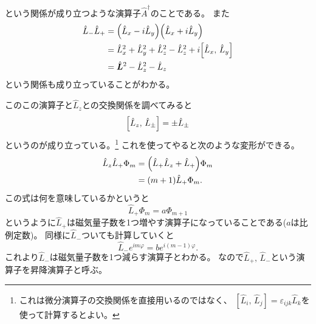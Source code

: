 \documentclass[../../master.tex]{subfiles}
\begin{document}
という関係が成り立つような演算子\(\hat{A}^\dag\)のことである。
また
\begin{equation}\begin{aligned}[b]
    \hat{L}_- \hat{L}_+ & = \qty(\hat{L}_x - i \hat{L}_y)\qty(\hat{L}_x + i\hat{L}_y)                         \\
	                    & =\hat{L}_x^2+\hat{L}_y^2 + \hat{L}_z^2 - \hat{L}_z^2 + i\qty[\hat{L}_x,\,\hat{L}_y] \\
	                    & =\hat{\vb*{L}}^2 -\hat{L}_z^2 -\hat{L}_z
\end{aligned}\end{equation}
という関係も成り立っていることがわかる。

このこの演算子と\(\hat{L}_z\)との交換関係を調べてみると
\begin{equation}
	\qty[\hat{L}_z,\,\hat{L}_\pm] = \pm \hat{L}_\pm
\end{equation}
というのが成り立っている。\footnote{これは微分演算子の交換関係を直接用いるのではなく、
	\([\hat{L}_i,\,\hat{L}_j]=\varepsilon_{ijk}\hat{L}_k\)を使って計算するとよい。}
これを使ってやると次のような変形ができる。
\begin{equation}\begin{aligned}[b]
    \hat{L}_z\hat{L}_+ \Phi_m
	 & = \qty(\hat{L}_+\hat{L}_z + \hat{L}_+)\Phi_m \\
	 & = (m+1)\hat{L}_+\Phi_m.
\end{aligned}\end{equation}
この式は何を意味しているかというと
\begin{equation}
	\hat{L}_+ \Phi_m = a \Phi_{m+1}
\end{equation}
というように\(\hat{L}_+\)は磁気量子数を1つ増やす演算子になっていることである(\(a\)は比例定数)。
同様に\(\hat{L}_-\)ついても計算していくと
\begin{equation}
	\hat{L}_- e^{im\varphi} =b e^{i(m-1)\varphi}.
\end{equation}
これより\(\hat{L}_-\)は磁気量子数を1つ減らす演算子とわかる。
なので\(\hat{L}_+,\,\hat{L}_-\)という演算子を昇降演算子と呼ぶ。
\end{document}
